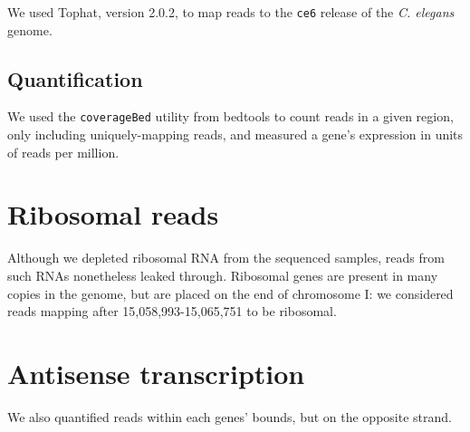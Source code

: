 \documentclass{article}
\begin{document}
We used Tophat, version 2.0.2, to map reads to the {\tt ce6} release of the {\em C. elegans} genome.

\subsection*{Quantification}

We used the {\tt coverageBed} utility from bedtools to count reads in a given region,
only including uniquely-mapping reads, and measured a gene's expression in units of
reads per million.


\section*{Ribosomal reads}

Although we depleted ribosomal RNA from the sequenced samples, reads from such RNAs nonetheless
leaked through. Ribosomal genes are present in many copies in the genome, but are placed on
the end of chromosome I: we considered reads mapping after 15,058,993-15,065,751 to be ribosomal.



\section*{Antisense transcription}

We also quantified reads within each genes' bounds, but on the opposite strand.
\end{document}
